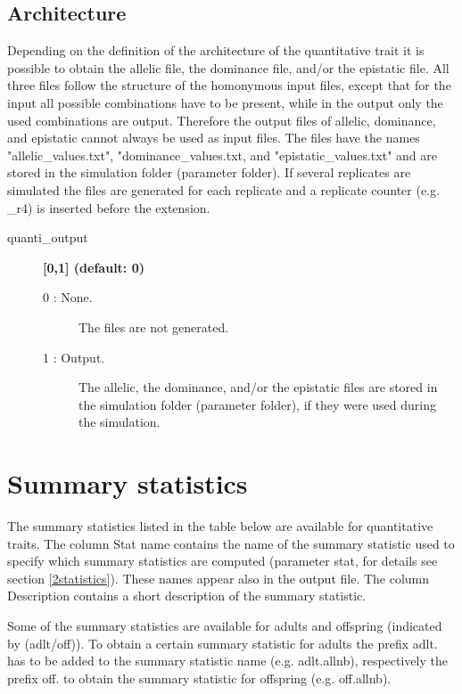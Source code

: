 \documentclass[letterpaper,12pt,oneside]{book}
\begin{document}
\subsection{Architecture}
Depending on the definition of the architecture of the quantitative trait it is possible to obtain the allelic file, the dominance file, and/or the epistatic file. All three files follow the structure of the homonymous input files, except that for the input all possible combinations have to be present, while in the output only the used combinations are output. Therefore the output files of allelic, dominance, and epistatic cannot always be used as input files. The files have the names \textsf{"allelic\_values.txt"}, \textsf{"dominance\_values.txt}, and \textsf{"epistatic\_values.txt"} and are stored in the simulation folder (parameter \textsf{folder}). If several replicates are simulated the files are generated for each replicate and a replicate counter (e.g. \_r4) is inserted before the extension.

\begin{description}
\item[quanti\_output] \textbf{[0,1] (default: 0)}\\
\begin {description}
\item[0 : None.] The files are not generated.
\item[1 : Output.] The allelic, the dominance, and/or the epistatic files are stored in the simulation folder (parameter \textsf{folder}), if they were used during the simulation.
\end{description}
\end{description}


\section{Summary statistics}\label{ssQuanti}
The summary statistics listed in the table below are available for quantitative traits. The column \textsf{Stat name} contains the name of the summary statistic used to specify which summary statistics are computed (parameter \textsf{stat}, for details see section \ref{2statistics}). These names appear also in the output file. The column \textsf{Description} contains a short description of the summary statistic. 

Some of the summary statistics are available for adults and offspring (indicated by \textsf{(adlt/off)}). To obtain a certain summary statistic for adults the prefix \textsf{adlt.} has to be added to the summary statistic name (e.g. \textsf{adlt.allnb}), respectively the prefix \textsf{off.} to obtain the summary statistic for offspring (e.g. \textsf{off.allnb}). 
\end{document}
